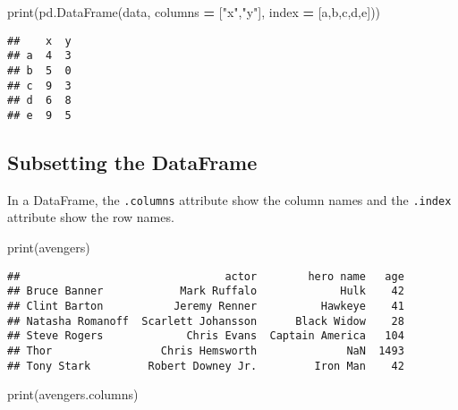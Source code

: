 \documentclass[
]{book}
\newenvironment{Shaded}{\begin{snugshade}}{\end{snugshade}}
\newcommand{\BuiltInTok}[1]{#1}
\newcommand{\NormalTok}[1]{#1}
\newcommand{\OperatorTok}[1]{\textcolor[rgb]{0.81,0.36,0.00}{\textbf{#1}}}
\newcommand{\StringTok}[1]{\textcolor[rgb]{0.31,0.60,0.02}{#1}}
\begin{document}
\begin{Shaded}
\begin{Highlighting}[]
\BuiltInTok{print}\NormalTok{(pd.DataFrame(data, columns }\OperatorTok{=}\NormalTok{ [}\StringTok{"x"}\NormalTok{,}\StringTok{"y"}\NormalTok{], index }\OperatorTok{=}\NormalTok{ [}\StringTok{\textquotesingle{}a\textquotesingle{}}\NormalTok{,}\StringTok{\textquotesingle{}b\textquotesingle{}}\NormalTok{,}\StringTok{\textquotesingle{}c\textquotesingle{}}\NormalTok{,}\StringTok{\textquotesingle{}d\textquotesingle{}}\NormalTok{,}\StringTok{\textquotesingle{}e\textquotesingle{}}\NormalTok{]))}
\end{Highlighting}
\end{Shaded}

\begin{verbatim}
##    x  y
## a  4  3
## b  5  0
## c  9  3
## d  6  8
## e  9  5
\end{verbatim}

\hypertarget{subsetting-the-dataframe}{%
\subsection{Subsetting the DataFrame}\label{subsetting-the-dataframe}}

In a DataFrame, the \texttt{.columns} attribute show the column names and the \texttt{.index} attribute
show the row names.

\begin{Shaded}
\begin{Highlighting}[]
\BuiltInTok{print}\NormalTok{(avengers)}
\end{Highlighting}
\end{Shaded}

\begin{verbatim}
##                                actor        hero name   age
## Bruce Banner            Mark Ruffalo             Hulk    42
## Clint Barton           Jeremy Renner          Hawkeye    41
## Natasha Romanoff  Scarlett Johansson      Black Widow    28
## Steve Rogers             Chris Evans  Captain America   104
## Thor                 Chris Hemsworth              NaN  1493
## Tony Stark         Robert Downey Jr.         Iron Man    42
\end{verbatim}

\begin{Shaded}
\begin{Highlighting}[]
\BuiltInTok{print}\NormalTok{(avengers.columns)}
\end{Highlighting}
\end{Shaded}
\end{document}
